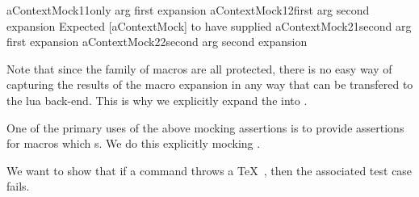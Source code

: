 \startConTest
\begingroup
  \assertMacroNthArgumentOnMthExpansionMatches%
    {aContextMock}{1}{1}{only arg first expansion}{}
  \assertMacroNthArgumentOnMthExpansionMatches%
    {aContextMock}{1}{2}{first arg second expansion}{}
  \startAssertShouldFail{}%
    {Expected [aContextMock] to have supplied}%
    {}
    \assertMacroNthArgumentOnMthExpansionMatches%
      {aContextMock}{2}{1}{second arg first expansion}{}
  \stopAssertShouldFail
  \assertMacroNthArgumentOnMthExpansionMatches%
    {aContextMock}{2}{2}{second arg second expansion}{}
\endgroup
\stopConTest
\stopTestCase

\stopTestSuite



Note that since the  family of macros are all 
protected, there is no easy way of capturing the results of the macro 
expansion in any way that can be transfered to the lua back-end. This is 
why we explicitly expand the \type{\aContextMock[anArg]} into 
. 


\startConTest
\begingroup
\endgroup
\stopConTest
\stopTestCase

\stopTestSuite

\startTestSuite[assertErrorThrown]

One of the primary uses of the above mocking assertions is to provide 
assertions for macros which  \type{\errmessage}s. We do this 
explicitly mocking \type{\errmessage}. 

\startMkIVCode
\def\mockErrMessage{%
  \mockTexMacro{errmessage}{1}
}
\def\assertErrorThrown#1{%
  \assertMacroExpanded{errmessage}{#1}
}
\stopMkIVCode


We want to show that if a command throws a \TeX\ \type{\errmessage}, then 
the associated test case fails. 


